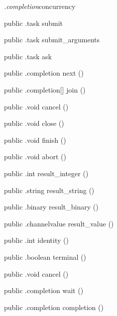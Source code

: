 \begin{CrexxClass}{\textit{.completion}}{concurrency}
\begin{Members}
    \Method
      {public}
      {.task}
      {submit}
      {}

    \Method
      {public}
      {.task}
      {submit\_arguments}
      {}

    \Method
      {public}
      {.task}
      {ask}
      {}

    \Method
      {public}
      {.completion}
      {next}
      {()}

    \Method
      {public}
      {.completion[]}
      {join}
      {()}

    \Method
      {public}
      {.void}
      {cancel}
      {()}

    \Method
      {public}
      {.void}
      {close}
      {()}

    \Method
      {public}
      {.void}
      {finish}
      {()}

    \Method
      {public}
      {.void}
      {abort}
      {()}

    \Method
      {public}
      {.int}
      {result\_integer}
      {()}

    \Method
      {public}
      {.string}
      {result\_string}
      {()}

    \Method
      {public}
      {.binary}
      {result\_binary}
      {()}

    \Method
      {public}
      {.channelvalue}
      {result\_value}
      {()}

    \Method
      {public}
      {.int}
      {identity}
      {()}

    \Method
      {public}
      {.boolean}
      {terminal}
      {()}

    \Method
      {public}
      {.void}
      {cancel}
      {()}

    \Method
      {public}
      {.completion}
      {wait}
      {()}

    \Method
      {public}
      {.completion}
      {completion}
      {()}


\end{Members}
\end{CrexxClass}
